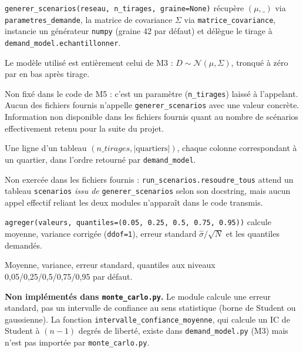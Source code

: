 \documentclass[11pt,a4paper]{article}
\begin{document}
\begin{description}[style=nextline]
  \item[Génération des scénarios] \texttt{generer\_scenarios(reseau,
  n\_tirages, graine=None)} récupère $(\mu, \_)$ via
  \texttt{parametres\_demande}, la matrice de covariance $\Sigma$ via
  \texttt{matrice\_covariance}, instancie un générateur \texttt{numpy}
  (graine 42 par défaut) et délègue le tirage à
  \texttt{demand\_model.echantillonner}.
  \item[Utilisation du modèle probabiliste] Le modèle utilisé est
  entièrement celui de M3 : $D \sim \mathcal{N}(\mu, \Sigma)$, tronqué à zéro
  par en bas après tirage.
  \item[Nombre de scénarios] Non fixé dans le code de M5 : c'est un
  paramètre (\texttt{n\_tirages}) laissé à l'appelant. Aucun des fichiers
  fournis n'appelle \texttt{generer\_scenarios} avec une valeur concrète.
  Information non disponible dans les fichiers fournis quant au nombre de
  scénarios effectivement retenu pour la suite du projet.
  \item[Structure d'un scénario] Une ligne d'un tableau $(n\_tirages,
  |\text{quartiers}|)$, chaque colonne correspondant à un quartier, dans
  l'ordre retourné par \texttt{demand\_model}.
  \item[Transmission au solveur] Non exercée dans les fichiers fournis :
  \texttt{run\_scenarios.resoudre\_tous} attend un tableau
  \texttt{scenarios} \emph{issu de} \texttt{generer\_scenarios} selon son
  docstring, mais aucun appel effectif reliant les deux modules n'apparaît
  dans le code transmis.
  \item[Agrégation des résultats] \texttt{agreger(valeurs, quantiles=(0.05,
  0.25, 0.5, 0.75, 0.95))} calcule moyenne, variance corrigée (\texttt{ddof=1}),
  erreur standard $\hat{\sigma}/\sqrt{N}$ et les quantiles demandés.
  \item[Statistiques calculées] Moyenne, variance, erreur standard,
  quantiles aux niveaux 0,05/0,25/0,5/0,75/0,95 par défaut.
  \item[Intervalles de confiance] \textbf{Non implémentés dans
  \texttt{monte\_carlo.py}.} Le module calcule une erreur standard, pas un
  intervalle de confiance au sens statistique (borne de Student ou
  gaussienne). La fonction \texttt{intervalle\_confiance\_moyenne}, qui
  calcule un IC de Student à $(n-1)$ degrés de liberté, existe dans
  \texttt{demand\_model.py} (M3) mais n'est pas importée par
  \texttt{monte\_carlo.py}.
\end{description}
\end{document}
